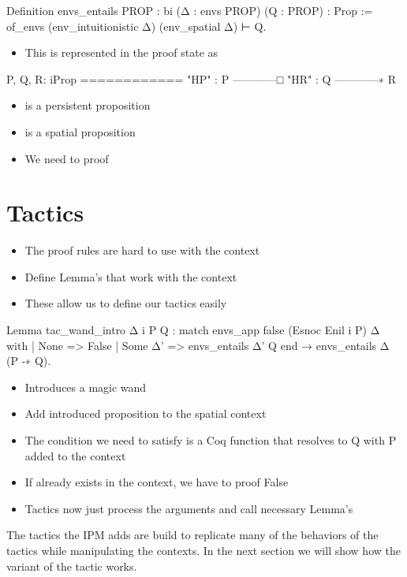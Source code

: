 \documentclass[thesis.tex]{subfiles}
\begin{document}
\begin{coqcode}
  Definition envs_entails {PROP : bi} 
      (Δ : envs PROP) (Q : PROP) : Prop :=
    of_envs (env_intuitionistic Δ) (env_spatial Δ) ⊢ Q.
\end{coqcode}
\begin{itemize}
  \item This is represented in the proof state as
\end{itemize}
\begin{coqcode}
  P, Q, R: iProp
  ============
  "HP" : P
  ------------□
  "HR" : Q
  ------------∗
  R
\end{coqcode}
\begin{itemize}
  \item {} is a persistent proposition
  \item {} is a spatial proposition
  \item We need to proof 
\end{itemize}

\section{Tactics}
\begin{itemize}
  \item The proof rules are hard to use with the context
  \item Define Lemma's that work with the context
  \item These allow us to define our tactics easily
\end{itemize}
\begin{coqcode}
  Lemma tac_wand_intro Δ i P Q :
    match envs_app false (Esnoc Enil i P) Δ with
    | None => False
    | Some Δ' => envs_entails Δ' Q
    end →
    envs_entails Δ (P -∗ Q).
\end{coqcode}
\begin{itemize}
  \item Introduces a magic wand
  \item Add introduced proposition to the spatial context
  \item The condition we need to satisfy is a Coq function that resolves to Q with P added to the context
  \item If  already exists in the context, we have to proof False
  \item Tactics now just process the arguments and call necessary Lemma's
\end{itemize}
The tactics the IPM adds are build to replicate many of the behaviors of the \coq tactics while manipulating the \iris contexts. In the next section we will show how the \iris variant of the  tactic works.
\end{document}

